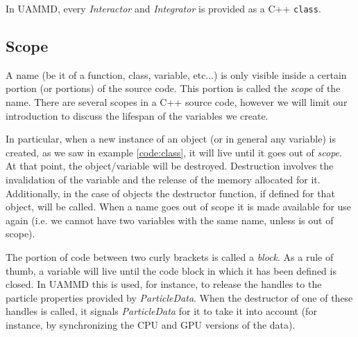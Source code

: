 \documentclass[ twoside,openright,titlepage,numbers=noenddot,%
headinclude,footinclude,cleardoublepage=empty,abstract=on,
BCOR=5mm,paper=b5,fontsize=11pt, dvipsnames
]{scrreprt}
\def\ucpp{uammd_cpp_lexer.py:UAMMDCppLexer -x}
\newcommand{\uammd}{\gls{UAMMD}\xspace}
\newcommand{\gpu}{\gls{GPU}\xspace}
\begin{document}
In \uammd, every \emph{Interactor} and \emph{Integrator} is provided as a C++ \texttt{class}.

\subsection*{Scope}
A name (be it of a function, class, variable, etc...) is only visible inside a certain portion (or portions) of the source code. This portion is called the \emph{scope} of the name. There are several scopes in a C++ source code, however we will limit our introduction to discuss the lifespan of the variables we create.

In particular, when a new instance of an object (or in general any variable) is created, as we saw in example \ref{code:class}, it will live until it goes out of \emph{scope}. At that point, the object/variable will be destroyed.
Destruction involves the invalidation of the variable and the release of the memory allocated for it. Additionally, in the case of objects the destructor function, if defined for that object, will be called. When a name goes out of scope it is made available for use again (i.e. we cannot have two variables with the same name, unless is out of scope).

The portion of code between two curly brackets is called a \emph{block}. As a rule of thumb, a variable will live until the code block in which it has been defined is closed. In \uammd this is used, for instance, to release the handles to the particle properties provided by \emph{ParticleData}. When the destructor of one of these handles is called, it signals \emph{ParticleData} for it to take it into account (for instance, by synchronizing the CPU and \gpu versions of the data).
\end{document}
